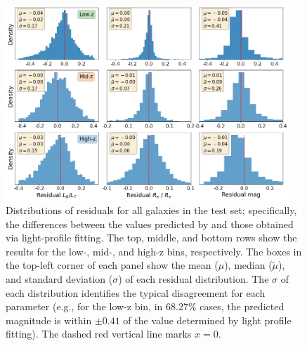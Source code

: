 \begin{figure}[htb]
    \centering
    \includegraphics[width = 0.95\textwidth]{resi_all_z.png}
    \caption{Distributions of residuals for all galaxies in the test set; specifically, the differences between the values predicted by \gampen{} and those obtained via light-profile fitting. The top, middle, and bottom rows show the results for the low-, mid-, and high-z bins, respectively. The boxes in the top-left corner of each panel show the mean ($\mu$), median ($\tilde{\mu}$), and standard deviation ($\sigma$) of each residual distribution. The $\sigma$ of each distribution identifies the typical disagreement for each parameter (e.g., for the low-z bin, in $68.27\%$ cases, the predicted magnitude is within $\pm0.41$ of the value determined by light profile fitting). The dashed red vertical line marks  $x=0$.}
    \label{fig_c3:resi_all_z}
\end{figure}

